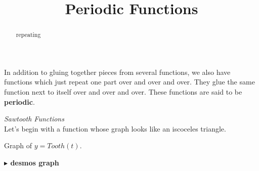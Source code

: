\documentclass{ximera}
\title{Periodic Functions}
\begin{document}
\begin{abstract}
repeating
\end{abstract}
\maketitle



In addition to gluing together pieces from several functions, we also have functions which just repeat one part over and over and over. They glue the same function next to itself over and over and over.  These functions are said to be \textbf{periodic}.









\begin{example}  \textit{Sawtooth Functions} \\


Let's begin with a function whose graph looks like an iscoceles triangle.


Graph of $y = Tooth(t)$.
\begin{image}
\end{image}






\begin{onlineOnly}
\textbf{\textcolor{blue!55!black}{$\blacktriangleright$ desmos graph}} 
\begin{center}
\end{center}
\end{onlineOnly}



\end{example}
\end{document}
